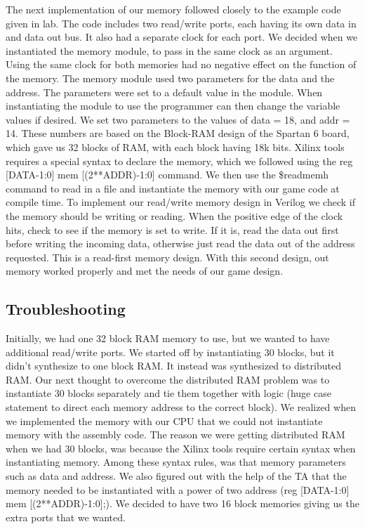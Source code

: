 \documentclass[11pt]{article}
\begin{document}
The next implementation of our memory followed closely to the example code given in lab. The code includes two read/write ports, each having its own data in and data out bus. It also had a separate clock for each port. We decided when we instantiated the memory module, to pass in the same clock as an argument. Using the same clock for both memories had no negative effect on the function of the memory. The memory module used two parameters for the data and the address. The parameters were set to a default value in the module. When instantiating the module to use the programmer can then change the variable values if desired. We set two parameters to the values of data = 18, and addr = 14. These numbers are based on the Block-RAM design of the Spartan 6 board, which gave us 32 blocks of RAM, with each block having 18k bits. Xilinx tools requires a special syntax to declare the memory, which we followed using the reg [DATA-1:0] mem [(2**ADDR)-1:0] command. We then use the \$readmemh command to read in a file and instantiate the memory with our game code at compile time. To implement our read/write memory design in Verilog we check if the memory should be writing or reading. When the positive edge of the clock hits, check to see if the memory is set to write. If it is, read the data out first before writing the incoming data, otherwise just read the data out of the address requested. This is a read-first memory design. With this second design, out memory worked properly and met the needs of our game design.


\subsection{Troubleshooting}
Initially, we had one 32 block RAM memory to use, but we wanted to have additional read/write ports. We started off by instantiating 30 blocks, but it didn’t synthesize to one block RAM. It instead was synthesized to distributed RAM. Our next thought to overcome the distributed RAM problem was to instantiate 30 blocks separately and tie them together with logic (huge case statement to direct each memory address to the correct block). We realized when we implemented the memory with our CPU that we could not instantiate memory with the assembly code. The reason we were getting distributed RAM when we had 30 blocks, was because the Xilinx tools require certain syntax when instantiating memory. Among these syntax rules, was that memory parameters such as data and address.  We also figured out with the help of the TA that the memory needed to be instantiated with a power of two address (reg [DATA-1:0] mem [(2**ADDR)-1:0];). We decided to have two 16 block memories giving us the extra ports that we wanted.
\end{document}
